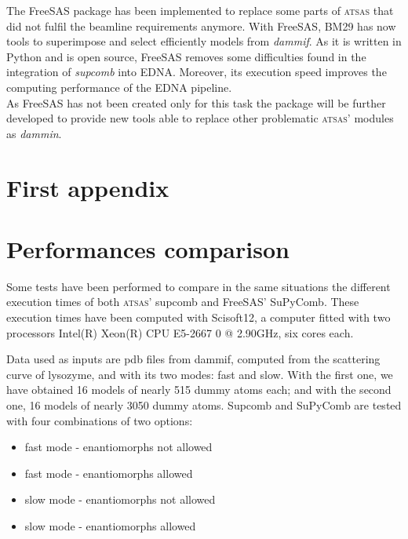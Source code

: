 \documentclass[a4paper, 11pt]{report}
\begin{document}
The FreeSAS package has been implemented to replace some parts of 
\textsc{atsas} that did not fulfil the beamline requirements anymore. 
With FreeSAS, BM29 has now tools to superimpose and select efficiently 
models from \textit{dammif}. 
As it is written in Python and is open source, FreeSAS removes some 
difficulties found in the integration of \textit{supcomb} into EDNA. 
Moreover, its execution speed improves the computing performance of 
the EDNA pipeline.\\

As FreeSAS has not been created only for this task the package will be 
further developed to provide new tools able to replace other 
problematic \textsc{atsas}' modules as \textit{dammin}.


\newpage                 %



\appendix


\chapter{First appendix}

\chapter{Performances comparison}
\label{perfappendix}

Some tests have been performed to compare in the same situations the 
different execution times of both \textsc{atsas}' supcomb and FreeSAS' 
SuPyComb. 
These execution times have been computed with Scisoft12, a computer 
fitted with two processors Intel(R) Xeon(R) CPU E5-2667 0 @ 2.90GHz, 
six cores each.

Data used as inputs are pdb files from dammif, computed from the 
scattering curve of lysozyme, and with its two modes: fast and slow. 
With the first one, we have obtained 16 models of nearly 515 dummy 
atoms each; and with the second one, 16 models of nearly 3050 dummy 
atoms. 
Supcomb and SuPyComb are tested with four combinations of two options: 
\begin{itemize}
\item fast mode - enantiomorphs not allowed
\item fast mode - enantiomorphs allowed
\item slow mode - enantiomorphs not allowed
\item slow mode - enantiomorphs allowed
\end{itemize}
\end{document}
